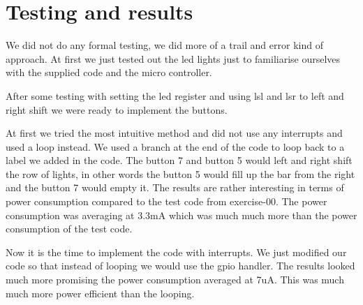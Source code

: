 \section{Testing and results}
We did not do any formal testing, we did more of a trail and error kind of approach.
At first we just tested out the led lights just to familiarise ourselves with the supplied code and the micro controller.

After some testing with setting the led register and using lsl and lsr to left and right shift we were ready to implement the buttons.

At first we tried the most intuitive method and did not use any interrupts and used a loop instead.
We used a branch at the end of the code to loop back to a label we added in the code.
The button 7 and button 5 would left and right shift the row of lights, in other words the button 5 would fill up the bar from the right and the button 7 would empty it.
The results are rather interesting in terms of power consumption compared to the test code from exercise-00.
The power consumption was averaging at 3.3mA which was much much more than the power consumption of the test code.

Now it is the time to implement the code with interrupts.
We just modified our code so that instead of looping we would use the gpio handler.
The results looked much more promising the power consumption averaged at 7uA.
This was much much more power efficient than the looping.
